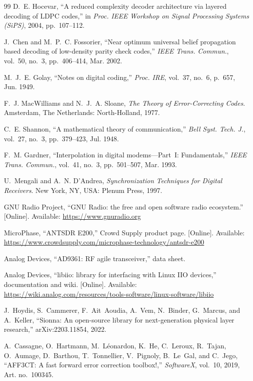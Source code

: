 \documentclass[11pt,a4paper,oneside]{report}
\begin{document}
\begin{thebibliography}{99}
 D.~E. Hocevar, ``A reduced complexity decoder architecture via layered
decoding of LDPC codes,'' in \emph{Proc. IEEE Workshop on Signal Processing Systems (SiPS)}, 2004,
pp.~107--112.

 J.~Chen and M.~P.~C. Fossorier, ``Near optimum universal belief propagation
based decoding of low-density parity check codes,'' \emph{IEEE Trans. Commun.}, vol.~50, no.~3,
pp.~406--414, Mar. 2002.

 M.~J.~E. Golay, ``Notes on digital coding,'' \emph{Proc. IRE}, vol.~37, no.~6,
p.~657, Jun. 1949.

 F.~J. MacWilliams and N.~J.~A. Sloane, \emph{The Theory of
Error-Correcting Codes}. Amsterdam, The Netherlands: North-Holland, 1977.

 C.~E. Shannon, ``A mathematical theory of communication,'' \emph{Bell Syst.
Tech. J.}, vol.~27, no.~3, pp.~379--423, Jul. 1948.

 F.~M. Gardner, ``Interpolation in digital modems---Part~I: Fundamentals,''
\emph{IEEE Trans. Commun.}, vol.~41, no.~3, pp.~501--507, Mar. 1993.

 U.~Mengali and A.~N. D'Andrea, \emph{Synchronization Techniques for Digital
Receivers}. New York, NY, USA: Plenum Press, 1997.

 GNU Radio Project, ``GNU Radio: the free and open software radio ecosystem.''
[Online]. Available: \url{https://www.gnuradio.org}

 MicroPhase, ``ANTSDR E200,'' Crowd Supply product page. [Online]. Available:
\url{https://www.crowdsupply.com/microphase-technology/antsdr-e200}

 Analog Devices, ``AD9361: RF agile transceiver,'' data sheet.

 Analog Devices, ``libiio: library for interfacing with Linux IIO devices,''
documentation and wiki. [Online]. Available: \url{https://wiki.analog.com/resources/tools-software/linux-software/libiio}

 J.~Hoydis, S.~Cammerer, F.~Ait~Aoudia, A.~Vem, N.~Binder, G.~Marcus, and A.~Keller,
``Sionna: An open-source library for next-generation physical layer research,'' arXiv:2203.11854, 2022.

 A.~Cassagne, O.~Hartmann, M.~L\'eonardon, K.~He, C.~Leroux, R.~Tajan, O.~Aumage,
D.~Barthou, T.~Tonnellier, V.~Pignoly, B.~Le~Gal, and C.~Jego, ``AFF3CT: A fast forward error
correction toolbox!,'' \emph{SoftwareX}, vol.~10, 2019, Art. no.~100345.


\end{thebibliography}
\end{document}
